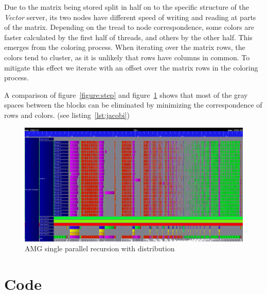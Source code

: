 \documentclass[a4paper,11pt]{scrartcl}
\begin{document}
Due to the matrix being stored split in half on to the specific structure of
the {\em Vector}\/ server, its two nodes have different speed of writing and
reading at parts of the matrix.
Depending on the tread to node correspondence, some colors are faster
calculated by the first half of threads, and others by the other half.
This emerges from the coloring process. When iterating over the matrix rows,
the colors tend to cluster, as it is unlikely that rows have columns in common.
To mitigate this effect we iterate with an offset over the matrix rows in the
coloring process.

A comparison of figure~\ref{figure:step} and figure~\ref{figure:stepdis} shows
that most of the gray spaces between the blocks can be eliminated by minimizing the
correspondence of rows and colors. (see listing~\ref{lst:jacobi})

\begin{figure}
    \includegraphics[width=1\textwidth]{one_iteration.png}
    \caption{AMG single parallel recursion with distribution}\label{figure:stepdis}
\end{figure}

\pagebreak

\section{Code}
\end{document}
